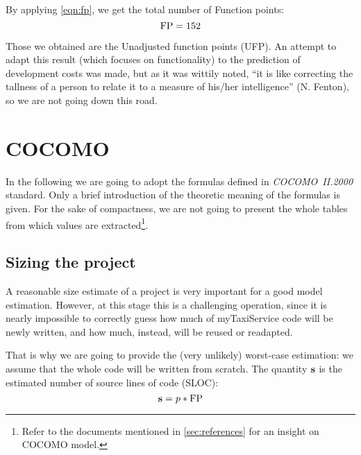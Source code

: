 By applying \cref{eqn:fp}, we get the total number of Function points:
\begin{equation}
	\text{FP} = 152
\end{equation}

Those we obtained are the Unadjusted function points (UFP). An attempt to adapt this result (which focuses on functionality) to the prediction of development costs was made, but as it was wittily noted, ``it is like correcting the tallness of a person to relate it to a measure of his/her intelligence'' (N. Fenton), so we are not going down this road.






















\section{COCOMO}

In the following we are going to adopt the formulas defined in \mbox{\emph{COCOMO II.2000}} standard. Only a brief introduction of the theoretic meaning of the formulas is given. For the sake of compactness, we are not going to present the whole tables from which values are extracted\footnote{Refer to the documents mentioned in \cref{sec:references} for an insight on COCOMO model.}.  


\subsection{Sizing the project}

A reasonable size estimate of a project is very important for a good model estimation. However, at this stage this is a challenging operation, since it is nearly impossible to correctly guess how much of myTaxiService code will be newly written, and how much, instead, will be reused or readapted.

That is why we are going to provide the (very unlikely) worst-case estimation: we assume that the whole code will be written from scratch. The quantity $\mathbf{s}$ is the estimated number of source lines of code (SLOC):
\begin{equation}
%
	\mSize = p * \mFP
%
\end{equation}

